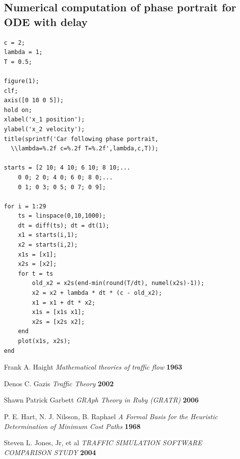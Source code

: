 \documentclass[11pt,a4paper]{article}
\begin{document}
\subsection{Numerical computation of phase portrait for ODE with delay}
\begin{verbatim}
c = 2;
lambda = 1;
T = 0.5;

figure(1);
clf;
axis([0 10 0 5]);
hold on;
xlabel('x_1 position');
ylabel('x_2 velocity');
title(sprintf('Car following phase portrait,
  \\lambda=%.2f c=%.2f T=%.2f',lambda,c,T));

starts = [2 10; 4 10; 6 10; 8 10;...
    0 0; 2 0; 4 0; 6 0; 8 0;...
    0 1; 0 3; 0 5; 0 7; 0 9];

for i = 1:29
    ts = linspace(0,10,1000);
    dt = diff(ts); dt = dt(1);
    x1 = starts(i,1);
    x2 = starts(i,2);
    x1s = [x1];
    x2s = [x2];
    for t = ts
        old_x2 = x2s(end-min(round(T/dt), numel(x2s)-1));
        x2 = x2 + lambda * dt * (c - old_x2);
        x1 = x1 + dt * x2;
        x1s = [x1s x1];
        x2s = [x2s x2];
    end
    plot(x1s, x2s);
end
\end{verbatim}

\begin{thebibliography}{99}
 Frank A. Haight
{\it Mathematical theories of traffic flow} {\bf 1963}

 Denos C. Gazis
{\it Traffic Theory} {\bf 2002}

 Shawn Patrick Garbett
{\it GRAph Theory in Ruby (GRATR)} {\bf 2006}

 P. E. Hart, N. J. Nilsson, B. Raphael
{\it A Formal Basis for the Heuristic Determination of Minimum Cost Paths} {\bf 1968}

 Steven L. Jones, Jr, et al
{\it TRAFFIC SIMULATION SOFTWARE COMPARISON STUDY} {\bf 2004}

\end{thebibliography}
\end{document}
